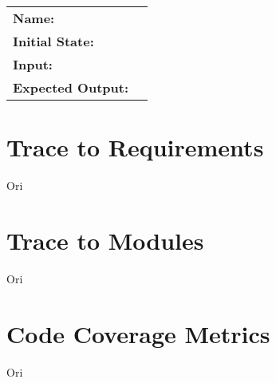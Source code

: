 \documentclass[12pt, titlepage]{article}
\begin{document}
\begin{center}
\begin{longtable}{ l | l }
\textbf{Name:} & \\
\textbf{Initial State:} & \\
\textbf{Input:} & \\
\textbf{Expected Output:} & \\
\hline

\end{longtable}

\end{center}
		
\section{Trace to Requirements}
	Ori

\section{Trace to Modules}		
	Ori

\section{Code Coverage Metrics}
	Ori




\end{document}
